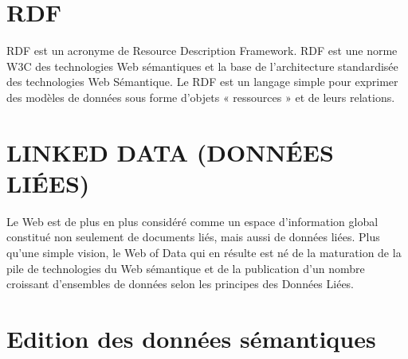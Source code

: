 \documentclass[12pt]{report}
\begin{document}
\section{RDF}
RDF est un acronyme de Resource Description Framework. RDF est une norme W3C des technologies Web sémantiques et la base de l’architecture standardisée des technologies Web Sémantique. Le RDF est un langage simple pour exprimer des modèles de données sous forme d'objets « ressources » et de leurs relations.

\section{LINKED DATA (DONNÉES LIÉES)}
Le Web est de plus en plus considéré comme un espace d’information global constitué non seulement de documents liés, mais aussi de données liées. Plus qu’une simple vision, le Web of Data qui en résulte est né de la maturation de la pile de technologies du Web sémantique et de la publication d’un nombre croissant d’ensembles de données selon les principes des Données Liées.\cite{LDOW}
\section{Edition des données sémantiques}
\end{document}
